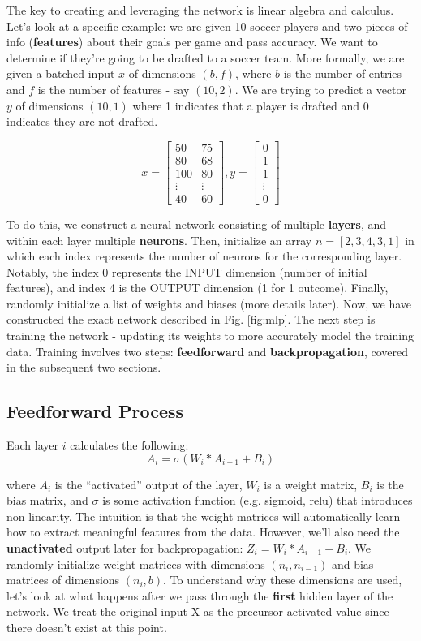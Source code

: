 \documentclass[12pt]{article}
\begin{document}
The key to creating and leveraging the network is linear algebra and calculus. Let's look at a specific example: we are given 10 soccer players and two pieces of info (\textbf{features}) about their goals per game and pass accuracy. We want to determine if they're going to be drafted to a soccer team. More formally, we are given a batched input $x$ of dimensions $(b, f)$, where $b$ is the number of entries and $f$ is the number of features - say $(10, 2)$. We are trying to predict a vector $y$ of dimensions $(10, 1)$ where 1 indicates that a player is drafted and 0 indicates they are not drafted. 

\[x=\begin{bmatrix}
50 & 75 \\
80 & 68 \\
100 & 80 \\
\vdots & \vdots \\
40 & 60
\end{bmatrix}, y=\begin{bmatrix}
0 \\
1 \\
1 \\
\vdots \\
0
\end{bmatrix}\]

To do this, we construct a neural network consisting of multiple \textbf{layers}, and within each layer multiple \textbf{neurons}. Then, initialize an array $n = [2, 3, 4, 3, 1]$ in which each index represents the number of neurons for the corresponding layer. Notably, the index 0 represents the INPUT dimension (number of initial features), and index 4 is the OUTPUT dimension (1 for 1 outcome). Finally, randomly initialize a list of weights and biases (more details later). Now, we have constructed the exact network described in Fig. \ref{fig:mlp}. The next step is training the network - updating its weights to more accurately model the training data. Training involves two steps: \textbf{feedforward} and \textbf{backpropagation}, covered in the subsequent two sections.  


\subsection{Feedforward Process}

Each layer $i$ calculates the following:
\[A_i = \sigma(W_i * A_{i-1} + B_i)\]

where $A_i$ is the \enquote{activated} output of the layer, $W_i$ is a weight matrix, $B_i$ is the bias matrix, and $\sigma$ is some activation function (e.g. sigmoid, relu) that introduces non-linearity. The intuition is that the weight matrices will automatically learn how to extract meaningful features from the data. However, we'll also need the \textbf{unactivated} output later for backpropagation: $Z_i = W_i * A_{i-1} + B_i$. We randomly initialize weight matrices with dimensions $(n_{i}, n_{i-1})$ and bias matrices of dimensions $(n_{i}, b)$. To understand why these dimensions are used, let's look at what happens after we pass through the \textbf{first} hidden layer of the network. We treat the original input X as the precursor activated value since there doesn't exist at this point. 
\end{document}
